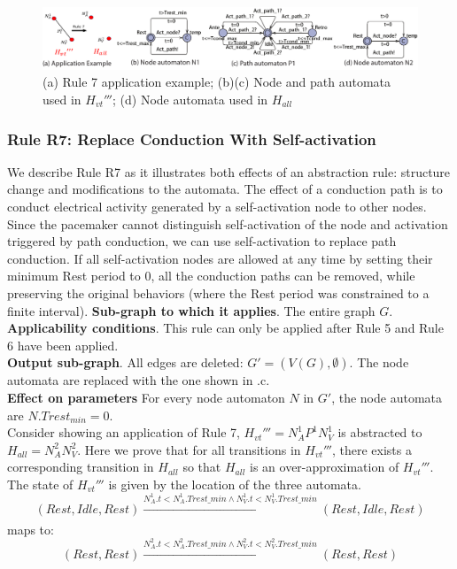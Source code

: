 \begin{figure}[!t]
	\centering
	\includegraphics[width=1.05\textwidth]{figs/rule5.pdf}
	\caption{\small (a) Rule 7 application example; (b)(c) Node and path automata used in $H_{vt}'''$; (d) Node automata used in $H_{all}$ }
	\vspace{-10pt}
	\label{fig:rule5}
\end{figure}

\subsubsection{Rule R7: Replace Conduction With Self-activation}
We describe Rule R7 as it illustrates both effects of an abstraction rule: structure change and modifications to the automata.
The effect of a conduction path is to conduct electrical activity generated by a self-activation node to other nodes. Since the pacemaker cannot distinguish self-activation of the node and activation triggered by path conduction, we can use self-activation to replace path conduction.
If all self-activation nodes are allowed at any time by setting their minimum Rest period to 0, all the conduction paths can be removed, while preserving the original behaviors (where the Rest period was constrained to a finite interval).
\textbf{Sub-graph to which it applies}.
The entire graph $G$.\\
\textbf{Applicability conditions}.
This rule can only be applied after Rule 5 and Rule 6 have been applied.\\
\textbf{Output sub-graph}.
All edges are deleted: $G' = (V(G), \emptyset)$. The node automata are replaced with the one shown in .c.\\
\textbf{Effect on parameters}
For every node automaton $N$ in $G'$, the node automata are $N.Trest_{min}=0$.\\

Consider  showing an application of Rule 7, $H_{vt}'''=N^1_AP^1N^1_V$ is abstracted to $H_{all}=N^2_AN^2_V$. Here we prove that for all transitions in $H_{vt}'''$, there exists a corresponding transition in $H_{all}$ so that $H_{all}$ is an over-approximation of $H_{vt}'''$. 
The state of $H_{vt}'''$ is given by the location of the three automata.
$$(Rest,Idle,Rest)\xrightarrow[]{N^1_A.t<N^1_A.Trest\_min \wedge N^1_V.t<N^1_V.Trest\_min}(Rest,Idle,Rest)$$
maps to:
$$(Rest,Rest)\xrightarrow[]{N^2_A.t<N^2_A.Trest\_min \wedge N^2_V.t<N^2_V.Trest\_min}(Rest,Rest)$$


%




